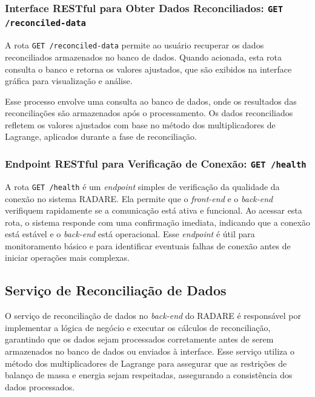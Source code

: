 \subsubsection{Interface RESTful para Obter Dados Reconciliados: \texttt{GET /reconciled-data}}

A rota \texttt{GET /reconciled-data} permite ao usuário recuperar os dados reconciliados armazenados no banco de dados. Quando acionada, esta rota consulta o banco e retorna os valores ajustados, que são exibidos na interface gráfica para visualização e análise.

Esse processo envolve uma consulta ao banco de dados, onde os resultados das reconciliações são armazenados após o processamento. Os dados reconciliados refletem os valores ajustados com base no método dos multiplicadores de Lagrange, aplicados durante a fase de reconciliação.

\subsubsection{Endpoint RESTful para Verificação de Conexão: \texttt{GET /health}}

A rota \texttt{GET /health} é um \textit{endpoint} simples de verificação da qualidade da conexão no sistema RADARE. Ela permite que o \textit{front-end} e o \textit{back-end} verifiquem rapidamente se a comunicação está ativa e funcional. Ao acessar esta rota, o sistema responde com uma confirmação imediata, indicando que a conexão está estável e o \textit{back-end} está operacional. Esse \textit{endpoint} é útil para monitoramento básico e para identificar eventuais falhas de conexão antes de iniciar operações mais complexas.

\subsection{Serviço de Reconciliação de Dados}

O serviço de reconciliação de dados no \textit{back-end} do RADARE é responsável por implementar a lógica de negócio e executar os cálculos de reconciliação, garantindo que os dados sejam processados corretamente antes de serem armazenados no banco de dados ou enviados à interface. Esse serviço utiliza o método dos multiplicadores de Lagrange para assegurar que as restrições de balanço de massa e energia sejam respeitadas, assegurando a consistência dos dados processados.


